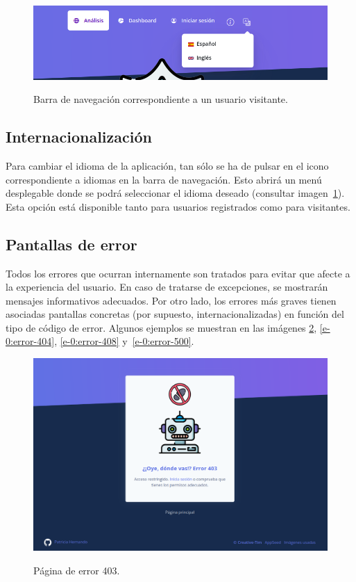 \begin{figure}[h]
	\caption[Manual de usuario: barra navegación (visitante)]{Barra de navegación correspondiente a un usuario visitante.}
	\centering
	\includegraphics[width=\textwidth]{../img/anexos/user_guide/9_navbar_no_init}
	\label{e-9:navbar-2}
\end{figure}


\subsection{Internacionalización}

Para cambiar el idioma de la aplicación, tan sólo se ha de pulsar en el icono correspondiente a idiomas en la barra de navegación. Esto abrirá un menú desplegable donde se podrá seleccionar el idioma deseado (consultar imagen~\ref{e-9:navbar-2}). Esta opción está disponible tanto para usuarios registrados como para visitantes.


\subsection{Pantallas de error}

Todos los errores que ocurran internamente son tratados para evitar que afecte a la experiencia del usuario. En caso de tratarse de excepciones, se mostrarán mensajes informativos adecuados. Por otro lado, los errores más graves tienen asociadas pantallas concretas (por supuesto, internacionalizadas) en función del tipo de código de error. Algunos ejemplos se muestran en las imágenes \ref{e-0:error-403}, \ref{e-0:error-404}, \ref{e-0:error-408} y~\ref{e-0:error-500}.

\begin{figure}[h]
	\caption[Manual de usuario: error 403]{Página de error 403.}
	\centering
	\includegraphics[width=\textwidth]{../img/anexos/user_guide/0_error_403}
	\label{e-0:error-403}
\end{figure}

